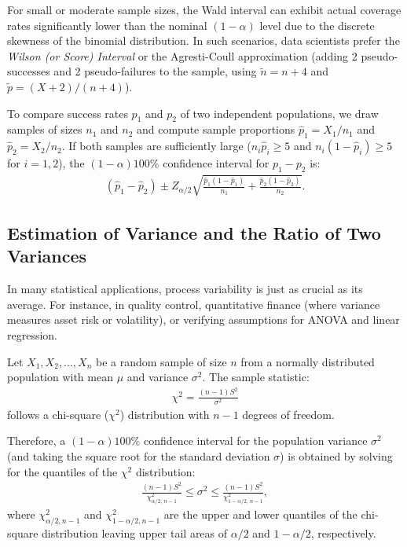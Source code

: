 \begin{observacion}
	For small or moderate sample sizes, the Wald interval can exhibit actual coverage rates significantly lower than the nominal $(1-\alpha)$ level due to the discrete skewness of the binomial distribution. In such scenarios, data scientists prefer the \emph{Wilson (or Score) Interval} or the Agresti-Coull approximation (adding 2 pseudo-successes and 2 pseudo-failures to the sample, using $\tilde{n} = n + 4$ and $\tilde{p} = (X+2)/(n+4)$).
\end{observacion}

\begin{teorema}
	To compare success rates $p_1$ and $p_2$ of two independent populations, we draw samples of sizes $n_1$ and $n_2$ and compute sample proportions $\hat{p}_1 = X_1/n_1$ and $\hat{p}_2 = X_2/n_2$. If both samples are sufficiently large ($n_i\hat{p}_i \geq 5$ and $n_i(1-\hat{p}_i) \geq 5$ for $i=1,2$), the $(1-\alpha)100\%$ confidence interval for $p_1 - p_2$ is:
	\begin{align}
		(\hat{p}_1 - \hat{p}_2) \pm Z_{\alpha/2} \sqrt{\frac{\hat{p}_1(1-\hat{p}_1)}{n_1} + \frac{\hat{p}_2(1-\hat{p}_2)}{n_2}}.
	\end{align}
\end{teorema}

\subsection{Estimation of Variance and the Ratio of Two Variances}

In many statistical applications, process variability is just as crucial as its average. For instance, in quality control, quantitative finance (where variance measures asset risk or volatility), or verifying assumptions for ANOVA and linear regression.

\begin{teorema}
	Let $X_1, X_2, \ldots, X_n$ be a random sample of size $n$ from a normally distributed population with mean $\mu$ and variance $\sigma^2$. The sample statistic:
	\begin{align}
		\chi^2 = \frac{(n-1)S^2}{\sigma^2}
	\end{align}
	follows a chi-square ($\chi^2$) distribution with $n-1$ degrees of freedom.
	
	Therefore, a $(1-\alpha)100\%$ confidence interval for the population variance $\sigma^2$ (and taking the square root for the standard deviation $\sigma$) is obtained by solving for the quantiles of the $\chi^2$ distribution:
	\begin{align}
		\frac{(n-1)S^2}{\chi^2_{\alpha/2, \, n-1}} \leq \sigma^2 \leq \frac{(n-1)S^2}{\chi^2_{1-\alpha/2, \, n-1}},
	\end{align}
	where $\chi^2_{\alpha/2, n-1}$ and $\chi^2_{1-\alpha/2, n-1}$ are the upper and lower quantiles of the chi-square distribution leaving upper tail areas of $\alpha/2$ and $1-\alpha/2$, respectively.
\end{teorema}

